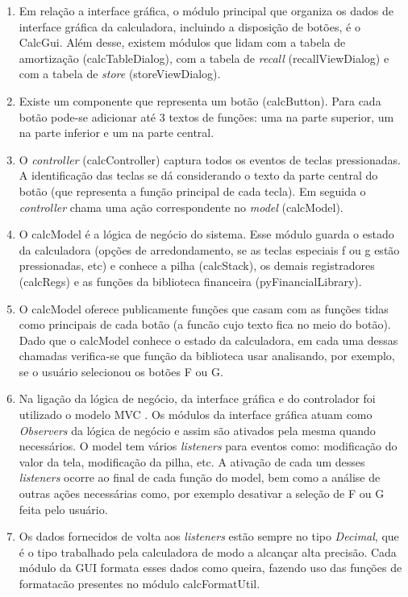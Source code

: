 \begin{enumerate}
 \item Em relação a interface gráfica, o módulo principal que organiza os dados de interface gráfica da calculadora, incluindo a disposição de botões, é o CalcGui. Além desse, existem módulos que lidam com a tabela de amortização (calcTableDialog), com a tabela de \textit{recall} (recallViewDialog) e com a tabela de \textit{store} (storeViewDialog). 

\item Existe um componente que representa um botão (calcButton). Para cada botão pode-se adicionar até 3 textos de funções: uma na parte superior, um na parte inferior e um na parte central.

\item O \textit{controller} (calcController) captura todos os eventos de teclas pressionadas. A identificação das teclas se dá considerando o texto da parte central do botão 
(que representa a função principal de cada tecla). Em seguida o \textit{controller} chama uma ação correspondente no \textit{model} (calcModel).

\item O calcModel é a lógica de negócio do sistema. Esse módulo guarda o estado da calculadora (opções de arredondamento, se as teclas especiais f ou g estão pressionadas, etc) e conhece a pilha (calcStack), os demais registradores (calcRegs) e as funções da biblioteca financeira (pyFinancialLibrary).

\item O calcModel oferece publicamente funções que casam com as funções tidas como principais de cada botão (a funcão cujo texto fica no meio do botão). Dado que o calcModel conhece o estado da calculadora, em cada uma dessas chamadas verifica-se que função da biblioteca usar analisando, por exemplo, se o usuário selecionou os botões F ou G.

\item Na ligação da lógica de negócio, da interface gráfica e do controlador foi utilizado o modelo MVC \cite {mvc}. Os módulos da interface gráfica atuam como \textit{Observers} da lógica de negócio e assim são ativados pela mesma quando necessários. O model tem vários \textit{listeners} para eventos como: modificação do valor da tela, modificação da pilha, etc. A ativação de cada um desses \textit{listeners} ocorre ao final de cada função do model, bem como a análise de outras ações necessárias como, por exemplo desativar a seleção de F ou G feita pelo usuário.

\item Os dados fornecidos de volta aos \textit{listeners} estão sempre no tipo \textit{Decimal}, que é o tipo trabalhado pela calculadora de modo a alcançar alta precisão. Cada módulo da GUI formata esses dados como queira, fazendo uso das funções de formatacão presentes no módulo calcFormatUtil.

\end{enumerate}

